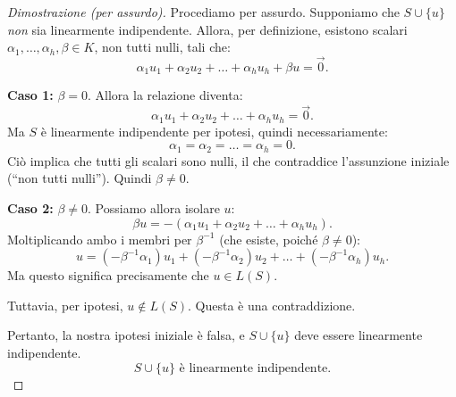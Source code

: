 
\begin{proof}[Dimostrazione (per assurdo)]
    Procediamo per assurdo.  
    Supponiamo che \(S \cup \{u\}\) \emph{non} sia linearmente indipendente.  
    Allora, per definizione, esistono scalari 
    \(\alpha_1, \dots, \alpha_h, \beta \in K\), non tutti nulli, tali che:
    \[
        \alpha_1 u_1 + \alpha_2 u_2 + \dots + \alpha_h u_h + \beta u = \vec{0}.
    \]

    \textbf{Caso 1:} \(\beta = 0\).  
    Allora la relazione diventa:
    \[
        \alpha_1 u_1 + \alpha_2 u_2 + \dots + \alpha_h u_h = \vec{0}.
    \]
    Ma \(S\) è linearmente indipendente per ipotesi, quindi necessariamente:
    \[
        \alpha_1 = \alpha_2 = \dots = \alpha_h = 0.
    \]
    Ciò implica che tutti gli scalari sono nulli, il che contraddice l’assunzione iniziale
    (“non tutti nulli”).  
    Quindi \(\beta \neq 0\).

    \medskip
    \textbf{Caso 2:} \(\beta \neq 0\).  
    Possiamo allora isolare \(u\):
    \[
        \beta u = -(\alpha_1 u_1 + \alpha_2 u_2 + \dots + \alpha_h u_h).
    \]
    Moltiplicando ambo i membri per \(\beta^{-1}\) (che esiste, poiché \(\beta \neq 0\)):
    \[
        u = (-\beta^{-1}\alpha_1) u_1 + (-\beta^{-1}\alpha_2) u_2 + \dots + (-\beta^{-1}\alpha_h) u_h.
    \]
    Ma questo significa precisamente che \(u \in L(S)\).

    Tuttavia, per ipotesi, \(u \notin L(S)\).  
    Questa è una contraddizione.

    \medskip
    Pertanto, la nostra ipotesi iniziale è falsa, e \(S \cup \{u\}\) deve essere linearmente indipendente.
    \[
        \boxed{S \cup \{u\} \text{ è linearmente indipendente.}}
    \]
\end{proof}

